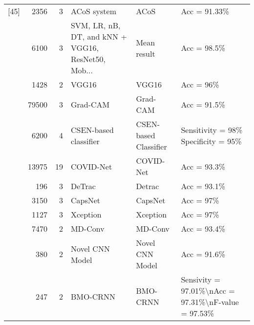 \begin{tabular}{lrrlll}
     [45] &                     2356 &        3 &                                        ACoS system &                          ACoS &                                       Acc = 91.33\% \\
     [46] &                     6100 &        3 & SVM, LR, nB, DT, and kNN + VGG16, ResNet50, Mob... &                   Mean result &                                        Acc = 98.5\% \\
     [47] &                     1428 &        2 &                                              VGG16 &                         VGG16 &                                          Acc = 96\% \\
     [48] &                    79500 &        3 &                                           Grad-CAM &                      Grad-CAM &                                        Acc = 91.5\% \\
     [49] &                     6200 &        4 &                              CSEN-based classifier &         CSEN-based Classifier &                Sensitivity = 98\% Specificity = 95\% \\
     [50] &                    13975 &       19 &                                          COVID-Net &                     COVID-Net &                                        Acc = 93.3\% \\
     [51] &                      196 &        3 &                                             DeTrac &                        Detrac &                                        Acc = 93.1\% \\
     [52] &                     3150 &        3 &                                            CapsNet &                       CapsNet &                                          Acc = 97\% \\
     [53] &                     1127 &        3 &                                           Xception &                      Xception &                                          Acc = 97\% \\
     [54] &                     7470 &        2 &                                            MD-Conv &                       MD-Conv &                                        Acc = 93.4\% \\
     [55] &                      380 &        2 &                                    Novel CNN Model &               Novel CNN Model &                                        Acc = 91.6\% \\
     [56] &                      247 &        2 &                                           BMO-CRNN &                      BMO-CRNN & Sensivity = 97.01\%\textbackslash nAcc = 97.31\%\textbackslash nF-value = 97.53\% \\
\bottomrule
\end{tabular}
